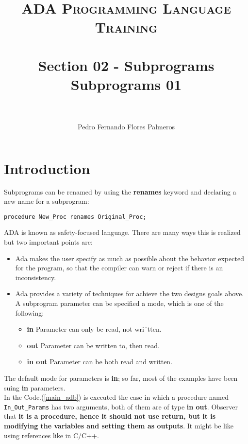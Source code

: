 \documentclass[paper=a4, fontsize=11pt]{scrartcl} %
\title{	
\normalfont \normalsize 
\textsc{ADA Programming Language Training} \\ [25pt] %
\horrule{0.5pt} \\[0.4cm] %
\huge Section 02 - Subprograms \\ Subprograms 01\\ %
\horrule{2pt} \\[0.5cm] %
}
\author{Pedro Fernando Flores Palmeros} %
\date{} %
\numberwithin{equation}{section} %
\numberwithin{figure}{section} %
\numberwithin{table}{section} %
\newcommand{\refCode}[1]{Code.(\ref{#1})}
\begin{document}
\maketitle %
 

\section{Introduction}

Subprograms can be renamed by using the \textbf{renames} keyword and declaring a new name for a subprogram:

\begin{lstlisting}[caption = {renames syntax}, label = {renames}]
procedure New_Proc renames Original_Proc;
\end{lstlisting}


ADA is known as safety-focused language. There are many ways this is realized but two important points are: 

\begin{itemize}
	\item Ada makes the user specify as much as possible about the behavior expected for the program, so that the compiler can warn or reject if there is an inconsistency.
	\item Ada provides a variety of techniques for achieve the two designs goals above. A subprogram parameter can be specified a mode, which is one of the following:
	\begin{itemize}
		\item \textbf{in} Parameter can only be read, not wri´tten.
		\item \textbf{out} Parameter can be written to, then read.
		\item \textbf{in out} Parameter can be both read and written.
	\end{itemize}
\end{itemize}
The default mode for parameters is \textbf{in}; so far, most of the examples have been suing \textbf{in} parameters.\\

In the \refCode{main_adb} is executed the case in which a procedure named \verb|In_Out_Params| has two arguments, both of them are of type \textbf{in out}. Observer that \textbf{it is a procedure, hence it should not use return, but it is modifying the variables and setting them as outputs}. It might be like using references like in C/C++.
\end{document}
